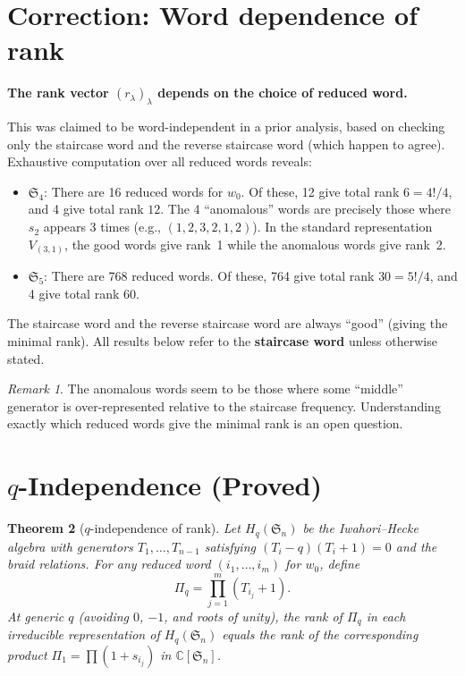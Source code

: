 \documentclass[11pt]{article}
\newtheorem{theorem}{Theorem}
\theoremstyle{definition}
\theoremstyle{remark}
\newtheorem{remark}[theorem]{Remark}
\newcommand{\CC}{\mathbb{C}}
\newcommand{\Sym}{\mathfrak{S}}
\begin{document}
\section{Correction: Word dependence of rank}
\label{sec:correction}

\textbf{The rank vector $(r_\lambda)_\lambda$ depends on the choice of reduced word.}

This was claimed to be word-independent in a prior analysis, based on checking
only the staircase word and the reverse staircase word (which happen to agree).
Exhaustive computation over all reduced words reveals:

\begin{itemize}
  \item \textbf{$\Sym_4$}: There are 16 reduced words for $w_0$.
    Of these, 12 give total rank $6 = 4!/4$, and 4 give total rank $12$.
    The 4 ``anomalous'' words are precisely those where $s_2$ appears 3 times
    (e.g., $(1,2,3,2,1,2)$).
    In the standard representation $V_{(3,1)}$, the good words give rank~1 while
    the anomalous words give rank~2.

  \item \textbf{$\Sym_5$}: There are 768 reduced words. Of these, 764 give total
    rank $30 = 5!/4$, and 4 give total rank $60$.
\end{itemize}

The staircase word and the reverse staircase word are always ``good'' (giving
the minimal rank). All results below refer to the \textbf{staircase word} unless
otherwise stated.

\begin{remark}
The anomalous words seem to be those where some ``middle'' generator is
over-represented relative to the staircase frequency.
Understanding exactly which reduced words give the minimal rank is an
open question.
\end{remark}


\section{$q$-Independence (Proved)}

\begin{theorem}[$q$-independence of rank]
\label{thm:q-indep}
Let $H_q(\Sym_n)$ be the Iwahori--Hecke algebra with generators $T_1, \dots, T_{n-1}$
satisfying $(T_i - q)(T_i + 1) = 0$ and the braid relations.
For any reduced word $(i_1, \dots, i_m)$ for $w_0$, define
\[
  \Pi_q = \prod_{j=1}^{m} (T_{i_j} + 1).
\]
At generic $q$ (avoiding $0$, $-1$, and roots of unity), the rank of $\Pi_q$ in
each irreducible representation of $H_q(\Sym_n)$ equals the rank of the
corresponding product $\Pi_1 = \prod(1 + s_{i_j})$ in $\CC[\Sym_n]$.
\end{theorem}
\end{document}
